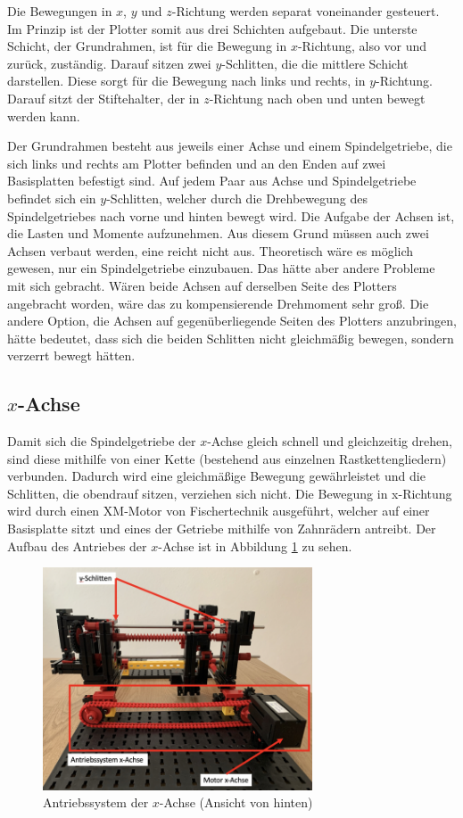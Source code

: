 \documentclass[conference,compsoc,final,a4paper]{IEEEtran}
\begin{document}
Die Bewegungen in $x$, $y$ und $z$-Richtung werden separat voneinander gesteuert. Im Prinzip ist der Plotter somit aus drei Schichten
aufgebaut. Die unterste Schicht, der Grundrahmen, ist für die Bewegung in $x$-Richtung, also vor und zurück, zuständig. Darauf
sitzen zwei $y$-Schlitten, die die mittlere Schicht darstellen. Diese sorgt für die Bewegung nach links und rechts, in $y$-Richtung.
Darauf sitzt der Stiftehalter, der in $z$-Richtung nach oben und unten bewegt werden kann.

Der Grundrahmen besteht aus jeweils einer Achse und einem Spindelgetriebe, die sich links und rechts am Plotter befinden und an
den Enden auf zwei Basisplatten befestigt sind. Auf jedem Paar aus Achse und Spindelgetriebe befindet sich ein $y$-Schlitten, welcher
durch die Drehbewegung des Spindelgetriebes nach vorne und hinten bewegt wird. Die Aufgabe der Achsen ist, die Lasten und Momente
aufzunehmen. Aus diesem Grund müssen auch zwei Achsen verbaut werden, eine reicht nicht aus.
Theoretisch wäre es möglich gewesen, nur ein Spindelgetriebe einzubauen. Das hätte aber andere Probleme mit sich gebracht. Wären beide Achsen auf derselben Seite des Plotters angebracht worden, wäre das zu kompensierende Drehmoment sehr groß. Die andere Option, die Achsen auf gegenüberliegende Seiten des Plotters anzubringen, hätte bedeutet, dass sich die beiden Schlitten nicht gleichmäßig bewegen, sondern verzerrt bewegt hätten.

\subsection{$x$-Achse}

Damit sich die Spindelgetriebe der $x$-Achse gleich schnell und gleichzeitig drehen, sind diese mithilfe von einer Kette (bestehend aus einzelnen
Rastkettengliedern) verbunden. Dadurch wird eine gleichmäßige Bewegung gewährleistet und die Schlitten, die obendrauf sitzen,
verziehen sich nicht. Die Bewegung in x-Richtung wird durch einen XM-Motor von Fischertechnik ausgeführt, welcher auf einer
Basisplatte sitzt und eines der Getriebe mithilfe von Zahnrädern antreibt. Der Aufbau des Antriebes der $x$-Achse ist in Abbildung \ref{fig:AufbauxAchse} zu sehen.


\begin{figure}[h]
\centering
\includegraphics[width=8cm]{../images/xAchse1.png}
\caption{Antriebssystem der $x$-Achse (Ansicht von hinten)}
\label{fig:AufbauxAchse}
\end{figure}
\end{document}
